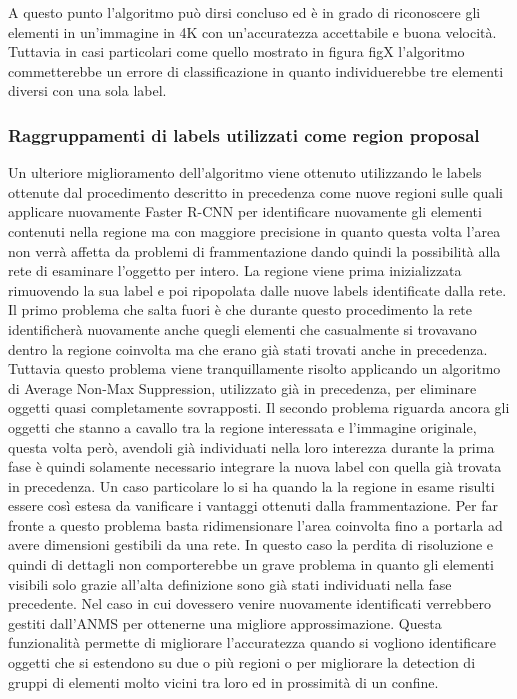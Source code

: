 A questo punto l'algoritmo può dirsi concluso ed è in grado di riconoscere gli elementi in un'immagine in 4K con un'accuratezza accettabile e buona velocità. Tuttavia in casi particolari come quello mostrato in figura figX l'algoritmo commetterebbe un errore di classificazione in quanto individuerebbe tre elementi diversi con una sola label.
\subsubsection{Raggruppamenti di labels utilizzati come region proposal}
Un ulteriore miglioramento dell'algoritmo viene ottenuto utilizzando le labels ottenute dal procedimento descritto in precedenza come nuove regioni sulle quali applicare nuovamente Faster R-CNN per identificare nuovamente gli elementi contenuti nella regione ma con maggiore precisione in quanto questa volta l'area non verrà affetta da problemi di frammentazione dando quindi la possibilità alla rete di esaminare l'oggetto per intero. La regione viene prima inizializzata rimuovendo la sua label e poi ripopolata dalle nuove labels identificate dalla rete.
Il primo problema che salta fuori è che durante questo procedimento la rete identificherà nuovamente anche quegli elementi che casualmente si trovavano dentro la regione coinvolta ma che erano già stati trovati anche in precedenza. Tuttavia questo problema viene tranquillamente risolto applicando un algoritmo di Average Non-Max Suppression, utilizzato già in precedenza, per eliminare oggetti quasi completamente sovrapposti. Il secondo problema riguarda ancora gli oggetti che stanno a cavallo tra la regione interessata e l'immagine originale, questa volta però, avendoli già individuati nella loro interezza durante la prima fase è quindi solamente necessario integrare la nuova label con quella già trovata in precedenza. 
Un caso particolare lo si ha quando la la regione in esame risulti essere così estesa da vanificare i vantaggi ottenuti dalla frammentazione. Per far fronte a questo problema basta ridimensionare l'area coinvolta fino a portarla ad avere dimensioni gestibili da una rete. In questo caso la perdita di risoluzione e quindi di dettagli non comporterebbe un grave problema in quanto gli elementi visibili solo grazie all'alta definizione sono già stati individuati nella fase precedente. Nel caso in cui dovessero venire nuovamente identificati verrebbero gestiti dall'ANMS per ottenerne una migliore approssimazione. Questa funzionalità permette di migliorare l'accuratezza quando si vogliono identificare oggetti che si estendono su due o più regioni o per migliorare la detection di gruppi di elementi molto vicini tra loro ed in prossimità di un confine. 


